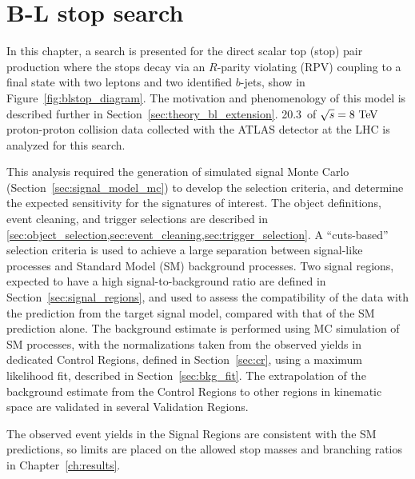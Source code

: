 \chapter[B-L stop search][B-L stop search]{B-L stop search}
\label{ch:bl_stop}

In this chapter, a search is presented for the direct scalar top (stop) pair
production where the stops decay via an $R$-parity violating (RPV) coupling to
a final state with two leptons and two identified $b$-jets, show in
Figure~\ref{fig:blstop_diagram}.
The motivation and phenomenology of this model is described further in
Section~\ref{sec:theory_bl_extension}.
20.3~\ifb of $\sqrt{s} = 8\TeV$ proton-proton collision data collected with the
ATLAS detector at the LHC is analyzed for this search.

This analysis required the generation of simulated signal Monte Carlo 
(Section~\ref{sec:signal_model_mc}) to develop the selection criteria, and
determine the expected sensitivity for the signatures of interest.
The object definitions, event cleaning, and trigger selections are described in
\cref{sec:object_selection,sec:event_cleaning,sec:trigger_selection}.
A ``cuts-based'' selection criteria is used to achieve a large separation between
signal-like processes and Standard Model (SM) background processes.
Two signal regions, expected to have a high signal-to-background ratio are
defined in Section~\ref{sec:signal_regions}, and used to assess the
compatibility of the data with the prediction from the target signal model,
compared with that of the SM prediction alone.
The background estimate is performed using MC simulation of SM processes, with
the normalizations taken from the observed yields in dedicated Control Regions,
defined in Section~\ref{sec:cr}, using a maximum likelihood fit, described in
Section~\ref{sec:bkg_fit}.
The extrapolation of the background estimate from the Control Regions to other
regions in kinematic space are validated in several Validation Regions.

The observed event yields in the Signal Regions are consistent with the SM
predictions, so limits are placed on the allowed stop masses and branching
ratios in Chapter~\ref{ch:results}.

